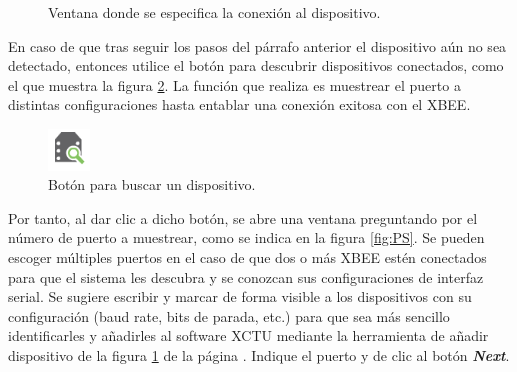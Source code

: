 \begin{figure}[H] %
\caption[1]{Ventana donde se especifica la conexión al dispositivo.}
\label{fig:AddW}
\end{figure}

En caso de que tras seguir los pasos del párrafo anterior el dispositivo aún no sea detectado, entonces utilice el botón para descubrir dispositivos conectados, como el que muestra la figura \ref{fig:SearchDev}. La función que realiza es muestrear el puerto a distintas configuraciones hasta entablar una conexión exitosa con el XBEE.

\begin{figure} %
    \centering
    \includegraphics[width=0.10\textwidth]{Figures/XCTU/SearchDevice}
    \caption[1]{Botón para buscar un dispositivo.}
    \label{fig:SearchDev}
\end{figure}

Por tanto, al dar clic a dicho botón, se abre una ventana preguntando por el número de puerto a muestrear, como se indica en la figura \ref{fig:PS}. Se pueden escoger múltiples puertos en el caso de que dos o más XBEE estén conectados para que el sistema les descubra y se conozcan sus configuraciones de interfaz serial. Se sugiere escribir y marcar de forma visible a los dispositivos con su configuración (baud rate, bits de parada, etc.) para que sea más sencillo identificarles y añadirles al software XCTU mediante la herramienta de añadir dispositivo de la figura \ref{fig:AddW} de la página \pageref{fig:AddW}. Indique el puerto y de clic al botón \textit{\textbf{Next}}.


